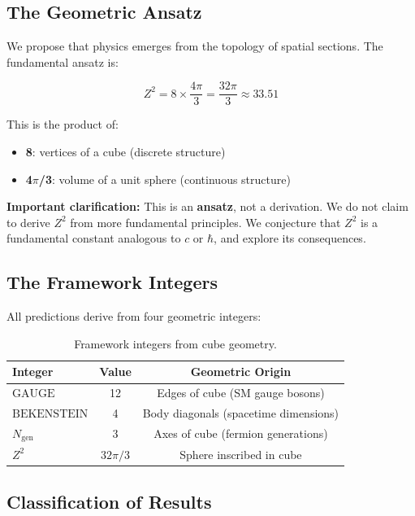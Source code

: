 \documentclass[12pt,a4paper]{article}
\newcommand{\Zsq}{Z^2}
\newcommand{\GAUGE}{\text{GAUGE}}
\newcommand{\BEKENSTEIN}{\text{BEKENSTEIN}}
\newcommand{\Ngen}{N_{\text{gen}}}
\begin{document}
\subsection{The Geometric Ansatz}

We propose that physics emerges from the topology of spatial sections. The fundamental ansatz is:

\begin{equation}
\boxed{\Zsq = 8 \times \frac{4\pi}{3} = \frac{32\pi}{3} \approx 33.51}
\end{equation}

This is the product of:
\begin{itemize}
    \item \textbf{8}: vertices of a cube (discrete structure)
    \item \textbf{4$\pi$/3}: volume of a unit sphere (continuous structure)
\end{itemize}

\textbf{Important clarification:} This is an \textbf{ansatz}, not a derivation. We do not claim to derive $\Zsq$ from more fundamental principles. We conjecture that $\Zsq$ is a fundamental constant analogous to $c$ or $\hbar$, and explore its consequences.

\subsection{The Framework Integers}

All predictions derive from four geometric integers:

\begin{table}[H]
\centering
\begin{tabular}{lcc}
\toprule
\textbf{Integer} & \textbf{Value} & \textbf{Geometric Origin} \\
\midrule
$\GAUGE$ & 12 & Edges of cube (SM gauge bosons) \\
$\BEKENSTEIN$ & 4 & Body diagonals (spacetime dimensions) \\
$\Ngen$ & 3 & Axes of cube (fermion generations) \\
$\Zsq$ & $32\pi/3$ & Sphere inscribed in cube \\
\bottomrule
\end{tabular}
\caption{Framework integers from cube geometry.}
\label{tab:integers}
\end{table}

\subsection{Classification of Results}
\end{document}
